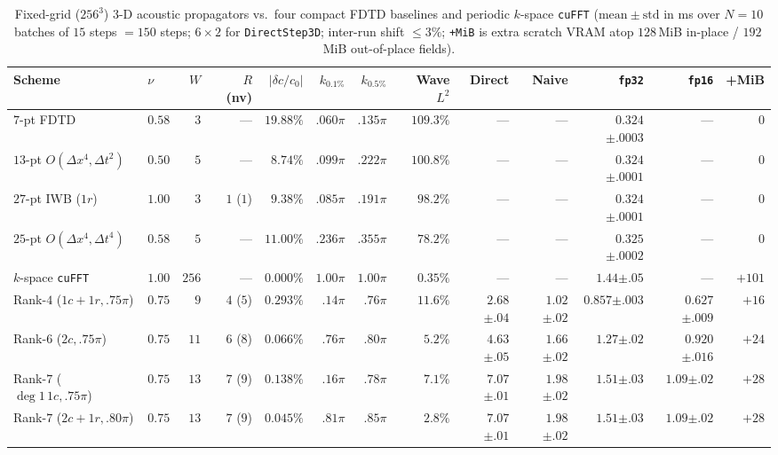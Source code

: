 \documentclass[11pt,a4paper]{article}
\theoremstyle{plain}
\theoremstyle{definition}
\begin{document}
\begin{table}[!htbp]
\centering
\caption{Fixed-grid ($256^3$) 3-D acoustic propagators vs.\ four compact FDTD baselines and periodic $k$-space \texttt{cuFFT} ($\mathrm{mean} \pm \mathrm{std}$ in ms over $N = 10$ batches of $15$ steps $= 150$ steps; $6 \times 2$ for \texttt{DirectStep3D}; inter-run shift $\le 3\%$; \texttt{+MiB} is extra scratch VRAM atop $128$\,MiB in-place / $192$\,MiB out-of-place fields).}\label{tab:acoustics3d}
\smallskip
{\scriptsize\setlength{\tabcolsep}{0.82pt}
\begin{tabular}{@{}llrrrrrrrrrrr@{}}
\toprule
Scheme & $\nu$ & $W$ & $R$ (nv) & $|\delta c/c_0|$ & $k_{0.1\%}$ & $k_{0.5\%}$ & Wave $L^2$ & Direct & Naive & \texttt{fp32} & \texttt{fp16} & +MiB \\
\midrule
$7$-pt FDTD & $0.58$ & $3$ & --- & $19.88\%$ & $.060\pi$ & $.135\pi$ & $109.3\%$ & --- & --- & $0.324${\tiny$\pm.0003$} & --- & $0$ \\
$13$-pt $O(\Delta x^4,\Delta t^2)$ & $0.50$ & $5$ & --- & $8.74\%$ & $.099\pi$ & $.222\pi$ & $100.8\%$ & --- & --- & $0.324${\tiny$\pm.0001$} & --- & $0$ \\
$27$-pt IWB ($1r$) & $1.00$ & $3$ & $1$ ($1$) & $9.38\%$ & $.085\pi$ & $.191\pi$ & $98.2\%$ & --- & --- & $0.324${\tiny$\pm.0001$} & --- & $0$ \\
$25$-pt $O(\Delta x^4,\Delta t^4)$ & $0.58$ & $5$ & --- & $11.00\%$ & $.236\pi$ & $.355\pi$ & $78.2\%$ & --- & --- & $0.325${\tiny$\pm.0002$} & --- & $0$ \\
$k$-space \texttt{cuFFT} & $1.00$ & $256$ & --- & $0.000\%$ & $1.00\pi$ & $1.00\pi$ & $0.35\%$ & --- & --- & $1.44${\tiny$\pm.05$} & --- & $+101$ \\
\midrule
Rank-$4$ ($1c{+}1r, .75\pi$) & $0.75$ & $9$ & $4$ ($5$) & $0.293\%$ & $.14\pi$ & $.76\pi$ & $11.6\%$ & $2.68${\tiny$\pm.04$} & $1.02${\tiny$\pm.02$} & $0.857${\tiny$\pm.003$} & $0.627${\tiny$\pm.009$} & $+16$ \\
Rank-$6$ ($2c, .75\pi$) & $0.75$ & $11$ & $6$ ($8$) & $0.066\%$ & $.76\pi$ & $.80\pi$ & $5.2\%$ & $4.63${\tiny$\pm.05$} & $1.66${\tiny$\pm.02$} & $1.27${\tiny$\pm.02$} & $0.920${\tiny$\pm.016$} & $+24$ \\
Rank-$7$ ($\deg 1\,1c, .75\pi$) & $0.75$ & $13$ & $7$ ($9$) & $0.138\%$ & $.16\pi$ & $.78\pi$ & $7.1\%$ & $7.07${\tiny$\pm.01$} & $1.98${\tiny$\pm.02$} & $1.51${\tiny$\pm.03$} & $1.09${\tiny$\pm.02$} & $+28$ \\
Rank-$7$ ($2c{+}1r, .80\pi$) & $0.75$ & $13$ & $7$ ($9$) & $0.045\%$ & $.81\pi$ & $.85\pi$ & $2.8\%$ & $7.07${\tiny$\pm.01$} & $1.98${\tiny$\pm.02$} & $1.51${\tiny$\pm.03$} & $1.09${\tiny$\pm.02$} & $+28$ \\

\end{tabular}}
\end{table}
\end{document}
